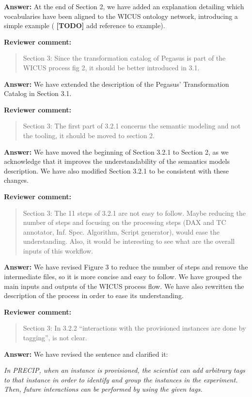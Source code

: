 \documentclass{letter}
\newenvironment{review}%
{\textbf{Reviewer comment:}\begin{quote}}%
{\end{quote}}%
\newcommand{\todo}[1]{%
      \color{red}\textbf{[TODO]} #1\color{black}}
\newcommand{\answer}[1]{%
      \textbf{Answer:} #1}
\newcommand{\revised}[1]{\emph{#1}\color{black}}
\begin{document}
\begin{letter}{}
\answer{At the end of Section 2, we have added an explanation detailing which vocabularies have been aligned to the WICUS ontology network, introducing a simple example (\todo{add reference to example}).}


\begin{review}
Section 3: Since the transformation catalog of Pegasus is part of the WICUS process fig 2, it should be better introduced in 3.1.
\end{review}

\answer{We have extended the description of the Pegasus' Transformation Catalog in Section 3.1.}


\begin{review}
Section 3: The first part of 3.2.1 concerns the semantic modeling and not the tooling, it should be moved to section 2.
\end{review}

\answer{We have moved the beginning of Section 3.2.1 to Section 2, as we acknowledge that it improves the understandability of the semantics models description. We have also modified Section 3.2.1 to be consistent with these changes.}


\begin{review}
Section 3: The 11 steps of 3.2.1 are not easy to follow. Maybe reducing the number of steps and focusing on the processing steps (DAX and TC annotator, Inf. Spec. Algorithm, Script generator), would ease the understanding. Also, it would be interesting to see what are the overall inputs of this workflow.
\end{review}

\answer{We have revised Figure 3 to reduce the number of steps and remove the intermediate files, so it is more concise and easy to follow. We have grouped the main inputs and outputs of the WICUS process flow. We have also rewritten the description of the process in order to ease its understanding.}


\begin{review}
Section 3: In 3.2.2 ``interactions with the provisioned instances are done by tagging'', is not clear.
\end{review}

\answer{We have revised the sentence and clarified it:}

\revised{In PRECIP, when an instance is provisioned, the scientist can add arbitrary tags to that instance in order to identify and group the instances in the experiment. Then, future interactions can be performed by using the given tags.}



\end{letter}
\end{document}
